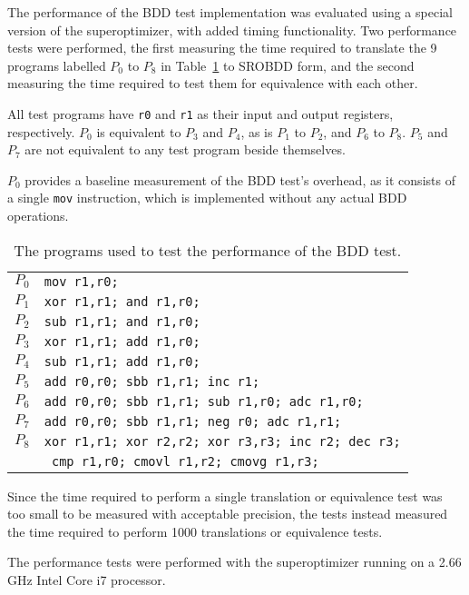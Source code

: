 \documentclass[a4paper,11pt]{kth-mag}
\begin{document}
The performance of the BDD test implementation was evaluated using a special version of the superoptimizer, with added timing functionality.
Two performance tests were performed,
the first measuring the time required to translate the 9 programs labelled $P_0$ to $P_8$ in Table~\ref{tab:test_programs} to SROBDD form,
and the second measuring the time required to test them for equivalence with each other.

All test programs have \verb|r0| and \verb|r1| as their input and output registers, respectively.
$P_0$ is equivalent to $P_3$ and $P_4$, as is $P_1$ to $P_2$, and $P_6$ to $P_8$.
$P_5$ and $P_7$ are not equivalent to any test program beside themselves.

$P_0$ provides a baseline measurement of the BDD test's overhead, as it consists of a single \verb|mov| instruction, which is implemented without any actual BDD operations.

\begin{table}
\centering
\begin{tabular}{l|l}
$P_0$ & \verb|mov r1,r0;| \\
$P_1$ & \verb|xor r1,r1; and r1,r0;| \\
$P_2$ & \verb|sub r1,r1; and r1,r0;| \\
$P_3$ & \verb|xor r1,r1; add r1,r0;| \\
$P_4$ & \verb|sub r1,r1; add r1,r0;| \\
$P_5$ & \verb|add r0,r0; sbb r1,r1; inc r1;| \\
$P_6$ & \verb|add r0,r0; sbb r1,r1; sub r1,r0; adc r1,r0;| \\
$P_7$ & \verb|add r0,r0; sbb r1,r1; neg r0; adc r1,r1;| \\
$P_8$ & \verb|xor r1,r1; xor r2,r2; xor r3,r3; inc r2; dec r3;|\\
      & \verb| cmp r1,r0; cmovl r1,r2; cmovg r1,r3;| \\
\end{tabular}
\caption{The programs used to test the performance of the BDD test.}
\label{tab:test_programs}
\end{table}

Since the time required to perform a single translation or equivalence test was too small to be measured with acceptable precision,
the tests instead measured the time required to perform 1000 translations or equivalence tests.

The performance tests were performed with the superoptimizer running on a 2.66 GHz Intel Core i7 processor.
\end{document}
